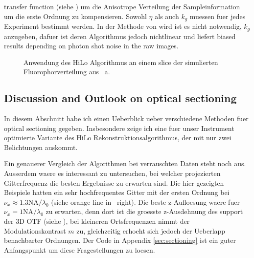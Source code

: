 transfer function (siehe ) um die
Anisotrope Verteilung der Sampleinformation um die erste Ordnung zu
kompensieren. Sowohl $\eta$ als auch $k_g$ muessen fuer jedes
Experiment bestimmt werden.  In der Methode von \citet{Mertz2010} wird
ist es nicht notwendig, $k_g$ anzugeben, dafuer ist deren Algorithmus
jedoch nichtlinear und liefert biased results depending on photon
shot noise in the raw images.
\begin{figure}[htbp]
  \centering
  \caption{Anwendung des HiLo Algorithmus an einem slice der
    simulierten Fluorophorverteilung aus
    ~a.}
  \label{fig:hilo-method-description}
\end{figure}

\subsection{Discussion and Outlook on optical sectioning}
In diesem Abschnitt habe ich einen Ueberblick ueber verschiedene
Methoden fuer optical sectioning gegeben. Insbesondere zeige ich eine
fuer unser Instrument optimierte Variante des HiLo
Rekonstruktionsalgorithmus, der mit nur zwei Belichtungen auskommt.

Ein genauerer Vergleich der Algorithmen bei verrauschten Daten steht
noch aus. Ausserdem waere es interessant zu untersuchen, bei welcher
projezierten Gitterfrequenz die besten Ergebnisse zu erwarten
sind. Die hier gezeigten Beispiele hatten ein sehr hochfrequentes
Gitter mit der ersten Ordnung bei $\nu_x\approx 1.3
\textrm{NA}/\lambda_0$ (siehe orange line in
~right). Die beste z-Aufloesung waere fuer
$\nu_x= 1 \textrm{NA}/\lambda_0$ zu erwarten, denn dort ist die
groesste z-Ausdehnung des support der 3D OTF (siehe
), bei kleineren Ortsfrequenzen nimmt der
Modulationskontrast $m$ zu, gleichzeitig erhoeht sich jedoch der
Ueberlapp benachbarter Ordnungen.  Der Code in Appendix
\ref{sec:sectioning} ist ein guter Anfangspunkt um diese
Fragestellungen zu loesen.

